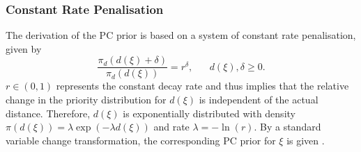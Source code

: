 \subsubsection*{Constant Rate Penalisation}
The derivation of the PC prior is based on a system of constant rate penalisation, given by
\begin{equation}
    \frac{\pi_d\left(d\left(\xi\right)+\delta\right)}{\pi_d\left(d\left(\xi\right)\right)}=r^{\delta}, \hspace{20pt} d\left(\xi\right),\delta\geq0.
\end{equation}
$r\in\left(0,1\right)$ represents the constant decay rate and thus implies that the relative change in the priority distribution for $d\left(\xi\right)$ is independent of the actual distance. Therefore, $d\left(\xi\right)$ is exponentially distributed with density $\pi\left(d\left(\xi\right)\right)=\lambda\exp\left(-\lambda d\left(\xi\right)\right)$ and rate $\lambda = -\ln\left(r\right)$. By a standard variable change transformation, the corresponding PC prior for $\xi$ is given \autocite[][]{simpson2017penalising}.
